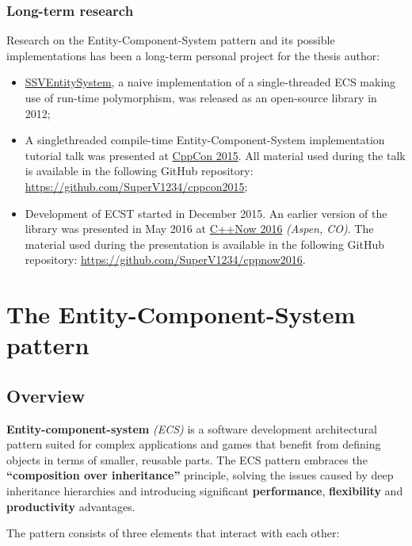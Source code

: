 \documentclass[oneside, 12pt, a4paper, openany]{book}
\begin{document}
\section{Long-term research}\label{long-term-research}

Research on the Entity-Component-System pattern and its possible
implementations has been a long-term personal project for the thesis
author:

\begin{itemize}
\item
  \href{https://github.com/SuperV1234/SSVEntitySystem}{SSVEntitySystem},
  a naive implementation of a single-threaded ECS making use of run-time
  polymorphism, was released as an open-source library in 2012;
\item
  A singlethreaded compile-time Entity-Component-System implementation
  tutorial talk was presented at \href{http://cppcon.org}{CppCon 2015}.
  All material used during the talk is available in the following GitHub
  repository: \url{https://github.com/SuperV1234/cppcon2015};
\item
  Development of ECST started in December 2015. An earlier version of
  the library was presented in May 2016 at
  \href{http://cppnow.org}{C++Now 2016} \emph{(Aspen, CO)}. The material
  used during the presentation is available in the following GitHub
  repository: \url{https://github.com/SuperV1234/cppnow2016}.
\end{itemize}

\part{The Entity-Component-System pattern}

\hypertarget{ecs_part_overview}{\chapter{Overview}\label{ecs_part_overview}}

\textbf{Entity-component-system} \emph{(ECS)} is a software development
architectural pattern suited for complex applications and games that
benefit from defining objects in terms of smaller, reusable parts. The
ECS pattern embraces the \textbf{``composition over inheritance''}
principle, solving the issues caused by deep inheritance hierarchies and
introducing significant \textbf{performance}, \textbf{flexibility} and
\textbf{productivity} advantages.

The pattern consists of three elements that interact with each other:
\end{document}
